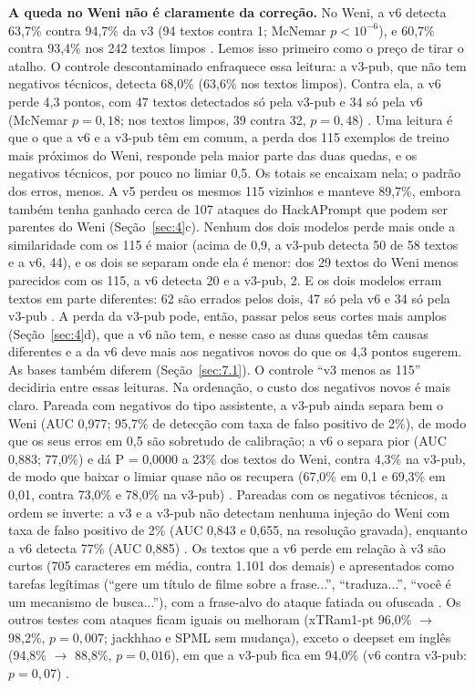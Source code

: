 \documentclass[11pt]{article}
\begin{document}
\textbf{A queda no Weni não é claramente da correção.} No Weni, a v6 detecta 63,7\% contra 94,7\% da v3 (94 textos contra 1; McNemar $p<10^{-6}$), e 60,7\% contra 93,4\% nos 242 textos limpos%
. Lemos isso primeiro como o preço de tirar o atalho. O controle descontaminado enfraquece essa leitura: a v3-pub, que não tem negativos técnicos, detecta 68,0\% (63,6\% nos textos limpos). Contra ela, a v6 perde 4,3 pontos, com 47 textos detectados só pela v3-pub e 34 só pela v6 (McNemar $p = 0{,}18$; nos textos limpos, 39 contra 32, $p = 0{,}48$)%
. Uma leitura é que o que a v6 e a v3-pub têm em comum, a perda dos 115 exemplos de treino mais próximos do Weni, responde pela maior parte das duas quedas, e os negativos técnicos, por pouco no limiar 0,5. Os totais se encaixam nela; o padrão dos erros, menos. A v5 perdeu os mesmos 115 vizinhos e manteve 89,7\%, embora também tenha ganhado cerca de 107 ataques do HackAPrompt que podem ser parentes do Weni (Seção~\ref{sec:4}c). Nenhum dos dois modelos perde mais onde a similaridade com os 115 é maior (acima de 0,9, a v3-pub detecta 50 de 58 textos e a v6, 44), e os dois se separam onde ela é menor: dos 29 textos do Weni menos parecidos com os 115, a v6 detecta 20 e a v3-pub, 2. E os dois modelos erram textos em parte diferentes: 62 são errados pelos dois, 47 só pela v6 e 34 só pela v3-pub%
. A perda da v3-pub pode, então, passar pelos seus cortes mais amplos (Seção~\ref{sec:4}d), que a v6 não tem, e nesse caso as duas quedas têm causas diferentes e a da v6 deve mais aos negativos novos do que os 4,3 pontos sugerem. As bases também diferem (Seção~\ref{sec:7.1}). O controle ``v3 menos as 115'' decidiria entre essas leituras. Na ordenação, o custo dos negativos novos é mais claro. Pareada com negativos do tipo assistente, a v3-pub ainda separa bem o Weni (AUC 0,977; 95,7\% de detecção com taxa de falso positivo de 2\%), de modo que os seus erros em 0,5 são sobretudo de calibração; a v6 o separa pior (AUC 0,883; 77,0\%) e dá P = 0,0000 a 23\% dos textos do Weni, contra 4,3\% na v3-pub, de modo que baixar o limiar quase não os recupera (67,0\% em 0,1 e 69,3\% em 0,01, contra 73,0\% e 78,0\% na v3-pub)%
. Pareadas com os negativos técnicos, a ordem se inverte: a v3 e a v3-pub não detectam nenhuma injeção do Weni com taxa de falso positivo de 2\% (AUC 0,843 e 0,655, na resolução gravada), enquanto a v6 detecta 77\% (AUC 0,885)%
. Os textos que a v6 perde em relação à v3 são curtos (705 caracteres em média, contra 1.101 dos demais) e apresentados como tarefas legítimas (``gere um título de filme sobre a frase...'', ``traduza...'', ``você é um mecanismo de busca...''), com a frase-alvo do ataque fatiada ou ofuscada%
. Os outros testes com ataques ficam iguais ou melhoram (xTRam1-pt 96,0\% \ensuremath{\rightarrow} 98,2\%, $p = 0{,}007$; jackhhao e SPML sem mudança), exceto o deepset em inglês (94,8\% \ensuremath{\rightarrow} 88,8\%, $p = 0{,}016$), em que a v3-pub fica em 94,0\% (v6 contra v3-pub: $p = 0{,}07$)%
.
\end{document}
